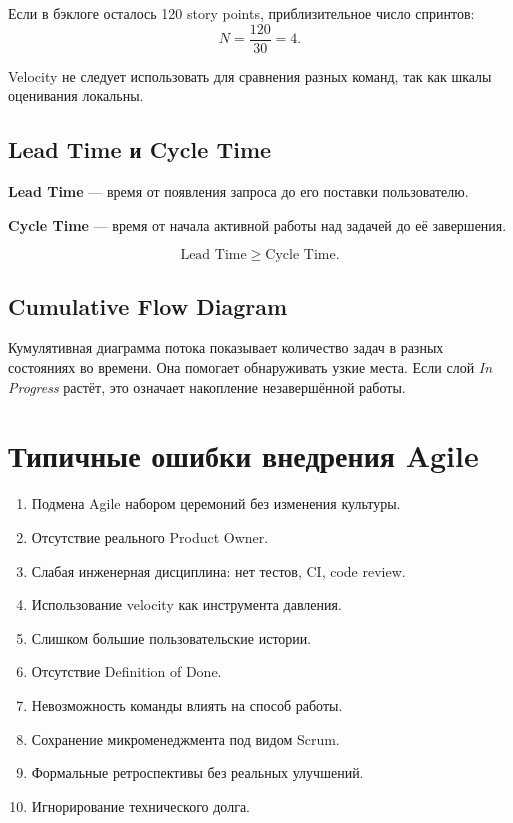 \documentclass[12pt,a4paper]{article}
\begin{document}
Если в бэклоге осталось 120 story points, приблизительное число спринтов:
\[
N = \frac{120}{30} = 4.
\]

Velocity не следует использовать для сравнения разных команд, так как шкалы оценивания локальны.

\subsection{Lead Time и Cycle Time}

\textbf{Lead Time} --- время от появления запроса до его поставки пользователю.

\textbf{Cycle Time} --- время от начала активной работы над задачей до её завершения.

\[
\text{Lead Time} \geq \text{Cycle Time}.
\]

\subsection{Cumulative Flow Diagram}

Кумулятивная диаграмма потока показывает количество задач в разных состояниях во времени. Она помогает обнаруживать узкие места. Если слой \textit{In Progress} растёт, это означает накопление незавершённой работы.

\section{Типичные ошибки внедрения Agile}

\begin{enumerate}
    \item Подмена Agile набором церемоний без изменения культуры.
    \item Отсутствие реального Product Owner.
    \item Слабая инженерная дисциплина: нет тестов, CI, code review.
    \item Использование velocity как инструмента давления.
    \item Слишком большие пользовательские истории.
    \item Отсутствие Definition of Done.
    \item Невозможность команды влиять на способ работы.
    \item Сохранение микроменеджмента под видом Scrum.
    \item Формальные ретроспективы без реальных улучшений.
    \item Игнорирование технического долга.
\end{enumerate}
\end{document}
